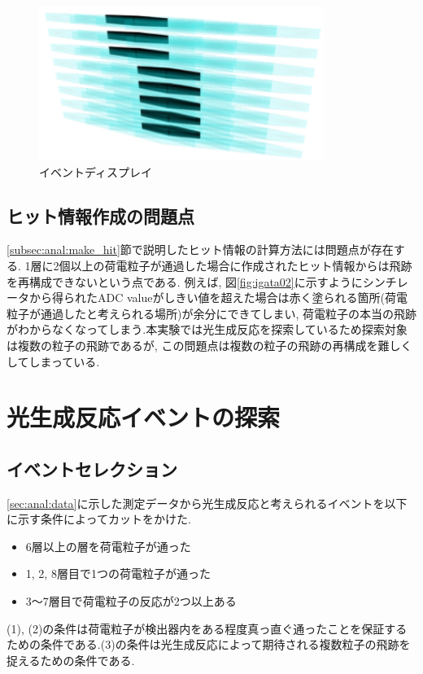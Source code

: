 \begin{figure}[H]
    \centering
    \includegraphics[height=5.0cm]{img/eventdisplay.png}
    \caption{イベントディスプレイ}
    \label{fig:eventdisplay}
\end{figure}
\subsection{ヒット情報作成の問題点}
\ref{subsec:anal:make_hit}節で説明したヒット情報の計算方法には問題点が存在する.
1層に2個以上の荷電粒子が通過した場合に作成されたヒット情報からは飛跡を再構成できないという点である.
例えば, 図\ref{fig:igata02}に示すようにシンチレータから得られたADC valueがしきい値を超えた場合は赤く塗られる箇所(荷電粒子が通過したと考えられる場所)が余分にできてしまい, 荷電粒子の本当の飛跡がわからなくなってしまう.本実験では光生成反応を探索しているため探索対象は複数の粒子の飛跡であるが, この問題点は複数の粒子の飛跡の再構成を難しくしてしまっている.

\section{光生成反応イベントの探索}
\subsection{イベントセレクション}\label{sec:anal:eventcut}
\ref{sec:anal:data}に示した測定データから光生成反応と考えられるイベントを以下に示す条件によってカットをかけた.
\begin{itemize}
    \item[(1)] 6層以上の層を荷電粒子が通った
    \item[(2)] 1, 2, 8層目で1つの荷電粒子が通った
    \item[(3)] 3〜7層目で荷電粒子の反応が2つ以上ある
\end{itemize}
(1), (2)の条件は荷電粒子が検出器内をある程度真っ直ぐ通ったことを保証するための条件である.(3)の条件は光生成反応によって期待される複数粒子の飛跡を捉えるための条件である.

